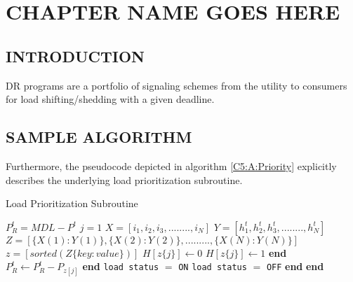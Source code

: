 \chapter{CHAPTER NAME GOES HERE}
\section{INTRODUCTION}
DR programs are a portfolio of signaling schemes from the utility to consumers for load shifting/shedding with a given deadline.
   
\section{SAMPLE ALGORITHM} 
Furthermore, the pseudocode depicted in algorithm \ref{C5:A:Priority} explicitly describes the underlying load prioritization subroutine.
\begin{algorithm}[!htb]
\caption{Load Prioritization Subroutine}
\label{C5:A:Priority}
\begin{algorithmic}
\State $P_R^t = MDL - P^t$
\State $j = 1$ 
\State $X = [i_1,i_2,i_3,........,i_N]$ 
\State $Y = [h_1^t,h_2^t,h_3^t,........,h_N^t]$
\State $Z = [\{X(1):Y(1)\},\{X(2):Y(2)\},.........,\{X(N):Y(N)\}]$ 
\State $z = [sorted(Z\{key:value\})]$
\State $H[z\{j\}]\gets 0$
\Else
\State $H[z\{j\}]\gets 1$
\EndIf
\State \textbf{end}
\State $P_R^t \gets P_R^t-P_{z[j]}$
\EndFor
\State \textbf{end}
\State \texttt{load status} $=$ \texttt{ON}
\Else
\State \texttt{load status} $=$ \texttt{OFF}
\EndIf
\State \textbf{end}
\EndFor
\State \textbf{end}
\end{algorithmic}
\end{algorithm}